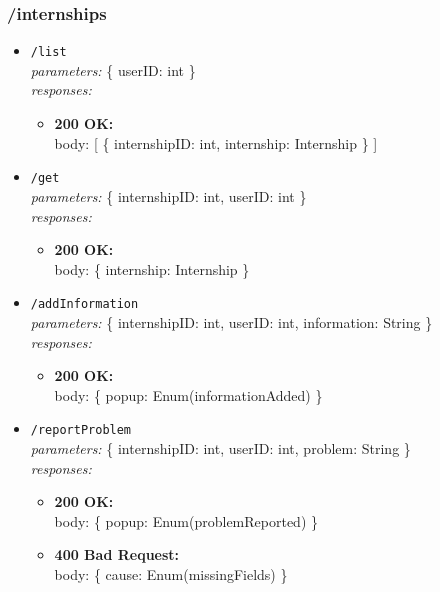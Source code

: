 \subsubsection*{/internships}
\begin{itemize}
    \item \texttt{/list} \\
        \textit{parameters:} \{ userID: int \} \\
        \textit{responses:}
        \begin{itemize}
            \item \textbf{200 OK:} \\
            body: [ \{ internshipID: int, internship: Internship \} ]
        \end{itemize}
    \item \texttt{/get} \\
        \textit{parameters:} \{ internshipID: int, userID: int \} \\
        \textit{responses:}
        \begin{itemize}
            \item \textbf{200 OK:} \\
            body: \{ internship: Internship \}
        \end{itemize}
    \item \texttt{/addInformation} \\
        \textit{parameters:} \{ internshipID: int, userID: int, information: String \} \\
        \textit{responses:}
        \begin{itemize}
            \item \textbf{200 OK:} \\
            body: \{ popup: Enum(informationAdded) \}
        \end{itemize}
    \item \texttt{/reportProblem} \\
        \textit{parameters:} \{ internshipID: int, userID: int, problem: String \} \\
        \textit{responses:}
        \begin{itemize}
            \item \textbf{200 OK:} \\
            body: \{ popup: Enum(problemReported) \}
            \item \textbf{400 Bad Request:} \\
            body: \{ cause: Enum(missingFields) \}
        \end{itemize}

\end{itemize}
